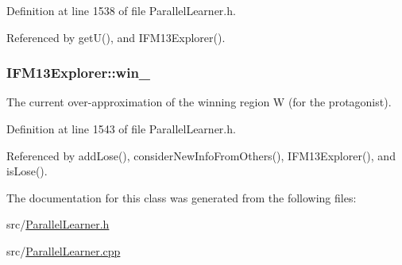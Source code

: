 Definition at line 1538 of file Parallel\-Learner.\-h.



Referenced by get\-U(), and I\-F\-M13\-Explorer().

\hypertarget{classIFM13Explorer_ac18c17a8e34556f0ad500c471a74f6ce}{
\subsubsection[{win\-\_\-}]{ I\-F\-M13\-Explorer\-::win\-\_\-\hspace{0.3cm}{\ttfamily [protected]}}}\label{classIFM13Explorer_ac18c17a8e34556f0ad500c471a74f6ce}


The current over-\/approximation of the winning region W (for the protagonist). 



Definition at line 1543 of file Parallel\-Learner.\-h.



Referenced by add\-Lose(), consider\-New\-Info\-From\-Others(), I\-F\-M13\-Explorer(), and is\-Lose().



The documentation for this class was generated from the following files\-:\begin{DoxyCompactItemize}
\item 
src/\hyperlink{ParallelLearner_8h}{Parallel\-Learner.\-h}\item 
src/\hyperlink{ParallelLearner_8cpp}{Parallel\-Learner.\-cpp}\end{DoxyCompactItemize}
